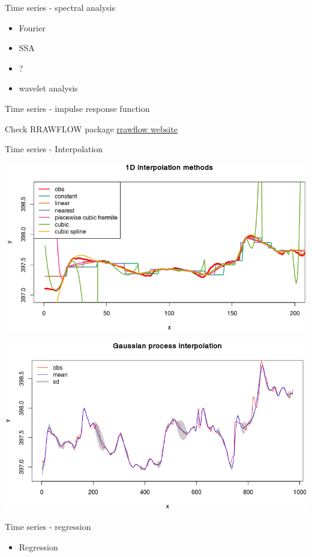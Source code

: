 \documentclass[8pt,ignorenonframetext,]{beamer}
\providecommand{\tightlist}{%
  \setlength{\itemsep}{0pt}\setlength{\parskip}{0pt}}
\begin{document}
\begin{frame}{Time series - spectral analysis}

\begin{itemize}
\tightlist
\item
  Fourier
\item
  SSA
\item
  ?
\item
  wavelet analysis
\end{itemize}

\end{frame}

\begin{frame}{Time series - impulse response function}

Check RRAWFLOW package
\href{https://sd.water.usgs.gov/projects/RRAWFLOW/RRAWFLOW.html}{rrawflow
website}

\end{frame}

\begin{frame}{Time series - Interpolation}

\includegraphics[height=0.35000\textwidth]{imgPres/TS_1D_interp.png}

\includegraphics[height=0.35000\textwidth]{imgPres/TS_GP_interp.png}

\end{frame}

\begin{frame}{Time series - regression}

\begin{itemize}
\tightlist
\item
  Regression
\end{itemize}

\end{frame}
\end{document}
